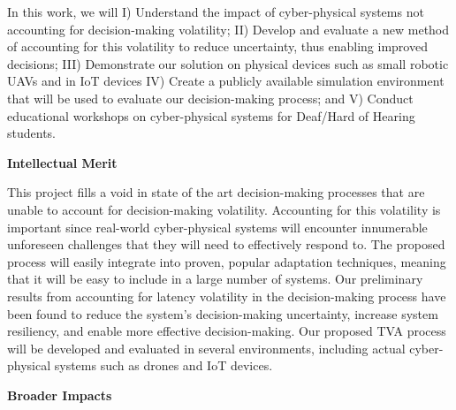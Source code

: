 \documentclass[11pt]{proposalnsf}
\begin{document}

In this work, we will I) Understand the impact of cyber-physical systems not accounting for decision-making volatility; II) Develop and evaluate a new method of accounting for this volatility to reduce uncertainty, thus enabling improved decisions; III) Demonstrate our solution on physical devices such as small robotic UAVs and in IoT devices IV) Create a publicly available simulation environment that will be used to evaluate our decision-making process; and V) Conduct educational workshops on cyber-physical systems for Deaf/Hard of Hearing students. 






\vspace{3mm}
\noindent \textbf{Intellectual Merit} %

This project fills a void in state of the art decision-making processes that are unable to account for decision-making volatility. Accounting for this volatility is important since real-world cyber-physical systems will encounter innumerable unforeseen challenges that they will need to effectively respond to. The proposed process will easily integrate into proven, popular adaptation techniques, meaning that it will be easy to include in a large number of systems. Our preliminary results from accounting for latency volatility in the decision-making process have been found to reduce the system's decision-making uncertainty, increase system resiliency, and enable more effective decision-making. Our proposed TVA process will be developed and evaluated in several environments, including actual cyber-physical systems such as drones and IoT devices. %





\vspace{3mm}
\noindent \textbf{Broader Impacts}

\end{document}
